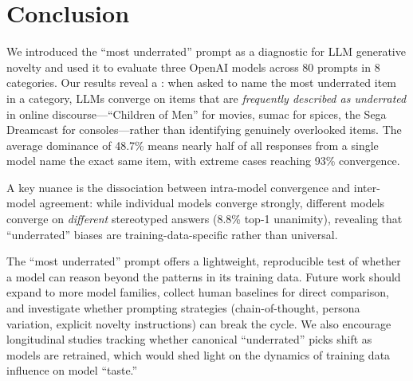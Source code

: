 \section{Conclusion}
\label{sec:conclusion}

We introduced the ``most underrated'' prompt as a diagnostic for LLM generative novelty and used it to evaluate three OpenAI models across 80 prompts in 8 categories. Our results reveal a \metapop: when asked to name the most underrated item in a category, LLMs converge on items that are \emph{frequently described as underrated} in online discourse---``Children of Men'' for movies, sumac for spices, the Sega Dreamcast for consoles---rather than identifying genuinely overlooked items. The average dominance of 48.7\% means nearly half of all responses from a single model name the exact same item, with extreme cases reaching 93\% convergence.

A key nuance is the dissociation between intra-model convergence and inter-model agreement: while individual models converge strongly, different models converge on \emph{different} stereotyped answers (8.8\% top-1 unanimity), revealing that ``underrated'' biases are training-data-specific rather than universal.

The ``most underrated'' prompt offers a lightweight, reproducible test of whether a model can reason beyond the patterns in its training data. Future work should expand to more model families, collect human baselines for direct comparison, and investigate whether prompting strategies (\eg chain-of-thought, persona variation, explicit novelty instructions) can break the \metapop cycle. We also encourage longitudinal studies tracking whether canonical ``underrated'' picks shift as models are retrained, which would shed light on the dynamics of training data influence on model ``taste.''
